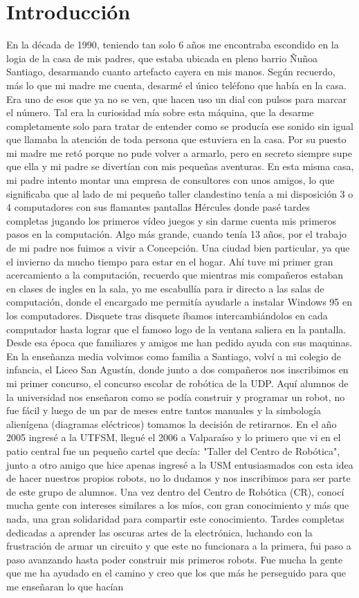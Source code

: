 \section{Introducción}
En la década de 1990, teniendo tan solo 6 años me encontraba escondido en la logia de la casa de mis padres, que estaba ubicada en pleno barrio Ñuñoa Santiago, desarmando cuanto artefacto cayera en mis manos. Según recuerdo, más lo que mi madre me cuenta, desarmé el único teléfono que había en la casa. Era uno de esos que ya no se ven, que hacen uso un dial con pulsos para marcar el número. Tal era la curiosidad mía sobre esta máquina, que la desarme completamente solo para tratar de entender como se producía ese sonido sin igual que llamaba la atención de toda persona que estuviera en la casa. Por su puesto mi madre me retó porque no pude volver a armarlo, pero en secreto siempre supe que ella y mi padre se divertían con mis pequeñas aventuras. En esta misma casa, mi padre intento montar una empresa de consultores con unos amigos, lo que significaba que al lado de mi pequeño taller clandestino tenía a mi disposición 3 o 4 computadores con sus flamantes pantallas Hércules donde pasé tardes completas jugando los primeros vídeo juegos y sin darme cuenta mis primeros pasos en la computación. Algo más grande, cuando tenía 13 años, por el trabajo de mi padre nos fuimos a vivir a Concepción. Una ciudad bien particular, ya que el invierno da mucho tiempo para estar en el hogar. Ahí tuve mi primer gran acercamiento a la computación, recuerdo que mientras mis compañeros estaban en clases de ingles en la sala, yo me escabullía para ir directo a las salas de computación, donde el encargado me permitía ayudarle a instalar Windows 95 en los computadores. Disquete tras disquete íbamos intercambiándolos en cada computador hasta lograr que el famoso logo de la ventana saliera en la pantalla. Desde esa época que familiares y amigos me han pedido ayuda con sus maquinas. En la enseñanza media volvimos como familia a Santiago, volví a mi colegio de infancia, el Liceo San Agustín, donde junto a dos compañeros nos inscribimos en mi primer concurso, el concurso escolar de robótica de la UDP. Aquí alumnos de la universidad nos enseñaron como se podía construir y programar un robot, no fue fácil y luego de un par de meses entre tantos manuales y la simbología alienígena (diagramas eléctricos) tomamos la decisión de retirarnos. En el año 2005 ingresé a la UTFSM, llegué el 2006 a Valparaíso y lo primero que vi en el patio central fue un pequeño cartel que decía: "Taller del Centro de Robótica", junto a otro amigo que hice apenas ingresé a la USM entusiasmados con esta idea de hacer nuestros propios robots, no lo dudamos y nos inscribimos para ser parte de este grupo de alumnos. Una vez dentro del Centro de Robótica (CR), conocí mucha gente con intereses similares a los míos, con gran conocimiento y más que nada, una gran solidaridad para compartir este conocimiento. Tardes completas dedicadas a aprender las oscuras artes de la electrónica, luchando con la frustración de armar un circuito y que este no funcionara a la primera, fui paso a paso avanzando hasta poder construir mis primeros robots. Fue mucha la gente que me ha ayudado en el camino y creo que los que más he perseguido para que me enseñaran lo que hacían 